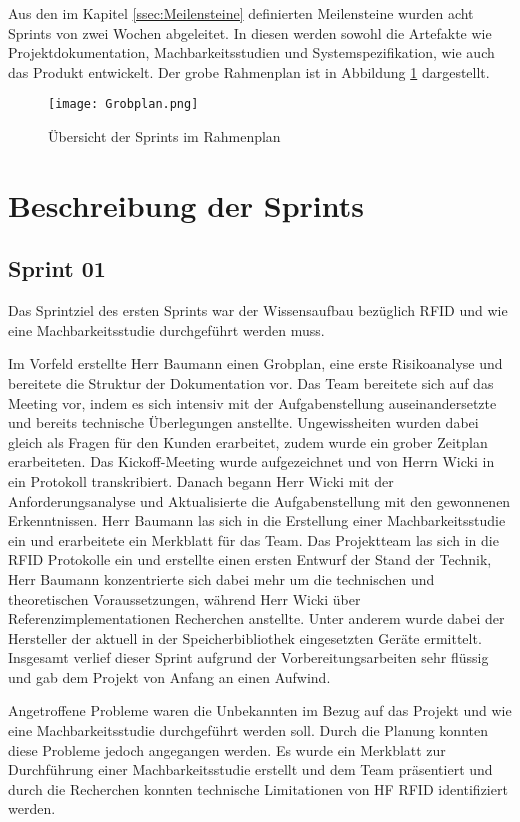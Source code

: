 Aus den im Kapitel \ref{ssec:Meilensteine} definierten Meilensteine wurden acht Sprints von zwei Wochen abgeleitet. In diesen werden sowohl die Artefakte wie Projektdokumentation, Machbarkeitsstudien und Systemspezifikation, wie auch das Produkt entwickelt. Der grobe Rahmenplan ist in Abbildung \ref{fig:Rahmenplan_1} dargestellt.

\begin{figure}[h!]
	\centering
	\texttt{[image: Grobplan.png]}
	\caption{Übersicht der Sprints im Rahmenplan}
	\label{fig:Rahmenplan_1}
\end{figure}

\section{Beschreibung der Sprints}

\subsection{Sprint 01}
Das Sprintziel des ersten Sprints war der Wissensaufbau bezüglich RFID und wie eine Machbarkeitsstudie durchgeführt werden muss.

Im Vorfeld erstellte Herr Baumann einen Grobplan, eine erste Risikoanalyse und bereitete die Struktur der Dokumentation vor. Das Team bereitete sich auf das Meeting vor, indem es sich intensiv mit der Aufgabenstellung auseinandersetzte und bereits technische Überlegungen anstellte. Ungewissheiten wurden dabei gleich als Fragen für den Kunden erarbeitet, zudem wurde ein grober Zeitplan erarbeiteten. Das Kickoff-Meeting wurde aufgezeichnet und von Herrn Wicki in ein Protokoll transkribiert. Danach begann Herr Wicki mit der Anforderungsanalyse und Aktualisierte die Aufgabenstellung mit den gewonnenen Erkenntnissen. Herr Baumann las sich in die Erstellung einer Machbarkeitsstudie ein und erarbeitete ein Merkblatt für das Team. Das Projektteam las sich in die RFID Protokolle ein und erstellte einen ersten Entwurf der Stand der Technik, Herr Baumann konzentrierte sich dabei mehr um die technischen und theoretischen Voraussetzungen, während Herr Wicki über Referenzimplementationen Recherchen anstellte. Unter anderem wurde dabei der Hersteller der aktuell in der Speicherbibliothek eingesetzten Geräte ermittelt. Insgesamt verlief dieser Sprint aufgrund der Vorbereitungsarbeiten sehr flüssig und gab dem Projekt von Anfang an einen Aufwind.

Angetroffene Probleme waren die Unbekannten im Bezug auf das Projekt und wie eine Machbarkeitsstudie durchgeführt werden soll. Durch die Planung konnten diese Probleme jedoch angegangen werden. Es wurde ein Merkblatt zur Durchführung einer Machbarkeitsstudie erstellt und dem Team präsentiert und durch die Recherchen konnten technische Limitationen von HF RFID identifiziert werden.

